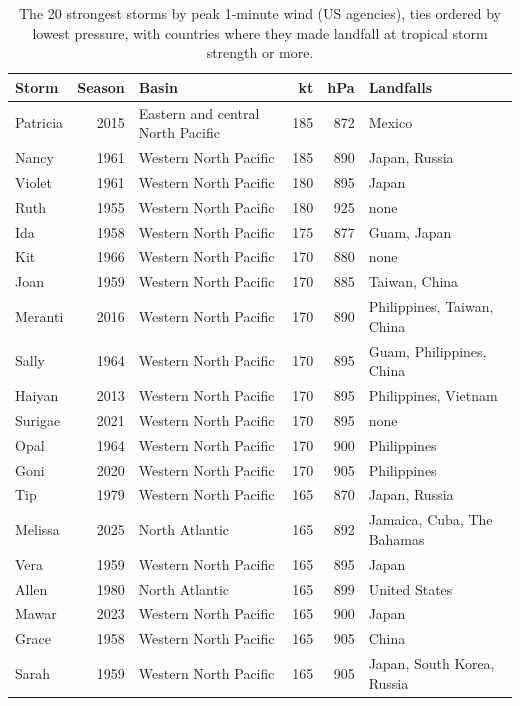 \documentclass[11pt,a4paper]{article}
\begin{document}
\begin{table}[tbp]\centering\small\caption{The 20 strongest storms by peak 1-minute wind (US agencies), ties ordered by lowest pressure, with countries where they made landfall at tropical storm strength or more.}\label{tab:strongest}\begin{tabular}{lrp{3.6cm}rrp{4.2cm}}\toprule Storm & Season & Basin & kt & hPa & Landfalls\\\midrule
Patricia & 2015 & Eastern and central North Pacific & 185 & 872 & Mexico\\
Nancy & 1961 & Western North Pacific & 185 & 890 & Japan, Russia\\
Violet & 1961 & Western North Pacific & 180 & 895 & Japan\\
Ruth & 1955 & Western North Pacific & 180 & 925 & none\\
Ida & 1958 & Western North Pacific & 175 & 877 & Guam, Japan\\
Kit & 1966 & Western North Pacific & 170 & 880 & none\\
Joan & 1959 & Western North Pacific & 170 & 885 & Taiwan, China\\
Meranti & 2016 & Western North Pacific & 170 & 890 & Philippines, Taiwan, China\\
Sally & 1964 & Western North Pacific & 170 & 895 & Guam, Philippines, China\\
Haiyan & 2013 & Western North Pacific & 170 & 895 & Philippines, Vietnam\\
Surigae & 2021 & Western North Pacific & 170 & 895 & none\\
Opal & 1964 & Western North Pacific & 170 & 900 & Philippines\\
Goni & 2020 & Western North Pacific & 170 & 905 & Philippines\\
Tip & 1979 & Western North Pacific & 165 & 870 & Japan, Russia\\
Melissa & 2025 & North Atlantic & 165 & 892 & Jamaica, Cuba, The Bahamas\\
Vera & 1959 & Western North Pacific & 165 & 895 & Japan\\
Allen & 1980 & North Atlantic & 165 & 899 & United States\\
Mawar & 2023 & Western North Pacific & 165 & 900 & Japan\\
Grace & 1958 & Western North Pacific & 165 & 905 & China\\
Sarah & 1959 & Western North Pacific & 165 & 905 & Japan, South Korea, Russia\\
\bottomrule\end{tabular}\end{table}
\end{document}
